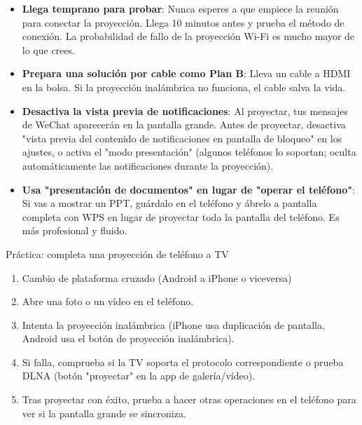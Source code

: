 \begin{itemize}
  \item \textbf{Llega temprano para probar}: Nunca esperes a que empiece la reunión para conectar la proyección. Llega 10 minutos antes y prueba el método de conexión. La probabilidad de fallo de la proyección Wi-Fi es mucho mayor de lo que crees.
  \item \textbf{Prepara una solución por cable como Plan B}: Lleva un cable a HDMI en la bolsa. Si la proyección inalámbrica no funciona, el cable salva la vida.
  \item \textbf{Desactiva la vista previa de notificaciones}: Al proyectar, tus mensajes de WeChat aparecerán en la pantalla grande. Antes de proyectar, desactiva "vista previa del contenido de notificaciones en pantalla de bloqueo" en los ajustes, o activa el "modo presentación" (algunos teléfonos lo soportan; oculta automáticamente las notificaciones durante la proyección).
  \item \textbf{Usa "presentación de documentos" en lugar de "operar el teléfono"}: Si vas a mostrar un PPT, guárdalo en el teléfono y ábrelo a pantalla completa con WPS en lugar de proyectar toda la pantalla del teléfono. Es más profesional y fluido.
\end{itemize}

\begin{tcbpractice}{Práctica: completa una proyección de teléfono a TV}
\begin{enumerate}
  \item Cambio de plataforma cruzado (Android a iPhone o viceversa)
  \item Abre una foto o un vídeo en el teléfono.
  \item Intenta la proyección inalámbrica (iPhone usa duplicación de pantalla, Android usa el botón de proyección inalámbrica).
  \item Si falla, comprueba si la TV soporta el protocolo correspondiente o prueba DLNA (botón "proyectar" en la app de galería/vídeo).
  \item Tras proyectar con éxito, prueba a hacer otras operaciones en el teléfono para ver si la pantalla grande se sincroniza.
\end{enumerate}

\end{tcbpractice}

